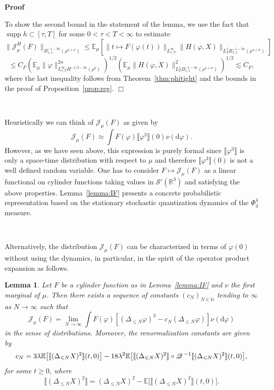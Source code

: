 \documentclass[a4paper,11pt]{article}
\newcommand{\mathd}{\mathrm{d}}
\newcommand{\tmop}[1]{\ensuremath{\operatorname{#1}}}
\newenvironment{proof}{\noindent\textbf{Proof\ }}{\hspace*{\fill}$\Box$\medskip}
\newtheorem{lemma}[theorem]{Lemma}
\numberwithin{equation}{section}
\newcommand{\Q}{\mathscr{Q} \hspace{.2em}}
\begin{document}
\begin{proof}
  
  To show the second bound in the statement of the lemma, we use the fact that
  $\tmop{supp} h \subset [\tau, T]$ for some $0 < \tau < T < \infty$ to
  estimate
  \[ \| \mathcal{J}^H_{\mu} (F) \|_{B_{1, 1}^{- 1 - 3 \kappa} (\rho^{4 +
     \sigma})} \leqslant \mathbb{E}_{\mu} [\| t \mapsto F (\varphi (t))
     \|_{L^{\infty}_{\tau, T}} \| H (\varphi, X) \|_{L^1_T B_{1, 1}^{- 1 - 3
     \kappa} (\rho^{4 + \sigma})}] \]
  \[ \leqslant C_F (\mathbb{E}_{\mu} \| \varphi \|_{L^{\infty}_{\tau, T} H^{-
     1 / 2 - 2\kappa} (\rho^2)}^{2 n})^{1 / 2} (\mathbb{E}_{\mu} \| H (\varphi,
     X) \|^2_{L^1_T B_{1, 1}^{- 1 - 3 \kappa} (\rho^{4 + \sigma})})^{1 / 2}
     \lesssim C_F, \]
  where the last inequality follows from Theorem~\ref{thm:phitight} and the
  bounds in the proof of Proposition~\ref{prop:reg}.
\end{proof}

\

Heuristically we can think of $\mathcal{J}_{\mu} (F)$ as given by
\[ \mathcal{J}_{\mu} (F) \approx \int F (\varphi) \llbracket \varphi^3
   \rrbracket (0) \nu (\mathd \varphi) . \]
However, as we have seen above, this expression is purely formal since
$\llbracket \varphi^3 \rrbracket$ is only a space-time distribution with
respect to $\mu$ and therefore $\llbracket \varphi^3 \rrbracket (0)$ is not a
well defined random variable. One has to consider $F \mapsto \mathcal{J}_{\mu}
(F)$ as a linear functional on cylinder functions taking values in
$\mathcal{S}' (\mathbb{R}^3)$ and satisfying the above properties.
Lemma~\ref{lemma:IF} presents a concrete probabilistic representation based on
the stationary stochastic quantization dynamics of the $\Phi^{4_{}}_3$
measure.

\

Alternatively, the distribution $\mathcal{J}_{\mu} (F)$ can be characterized
in terms of $\varphi (0)$ without using the dynamics, in particular, in the
spirit of the operator product expansion as follows.

\begin{lemma}\label{lem:OPE}
  Let $F$ be a cylinder function as in Lemma~\ref{lemma:IF} and $\nu$ the
  first marginal of $\mu$. Then there exists a sequence of constants $(c_N)_{N
  \in \mathbb{N}}$ tending to $\infty$ as $N \rightarrow \infty$ such that
  \[ \mathcal{J}_{\mu} (F) = \lim_{N \rightarrow \infty} \int F (\varphi)
     [(\Delta_{\leqslant N} \varphi)^3 - c_N (\Delta_{\leqslant N} \varphi)]
     \nu (\mathd \varphi) \]
     in the sense of distributions. Moreover, the renormalization constants are given by
     $$
     c_{N}=3\lambda\mathbb{E}\big[\llbracket (\Delta_{\leqslant N}X)^{2}\rrbracket(t,0)\big]-18\lambda^{2}\mathbb{E}\big[\llbracket (\Delta_{\leqslant N}X)^{2}\rrbracket\circ\Q^{-1}\llbracket (\Delta_{\leqslant N}X)^{2}\rrbracket(t,0)\big],
     $$
     for some $t\geqslant 0$, where
     $$
     \llbracket (\Delta_{\leqslant N}X)^{2}\rrbracket=(\Delta_{\leqslant N}X)^{2}-\mathbb{E}\big[\llbracket (\Delta_{\leqslant N}X)^{2}\rrbracket(t,0)\big].
     $$
\end{lemma}
\end{document}
